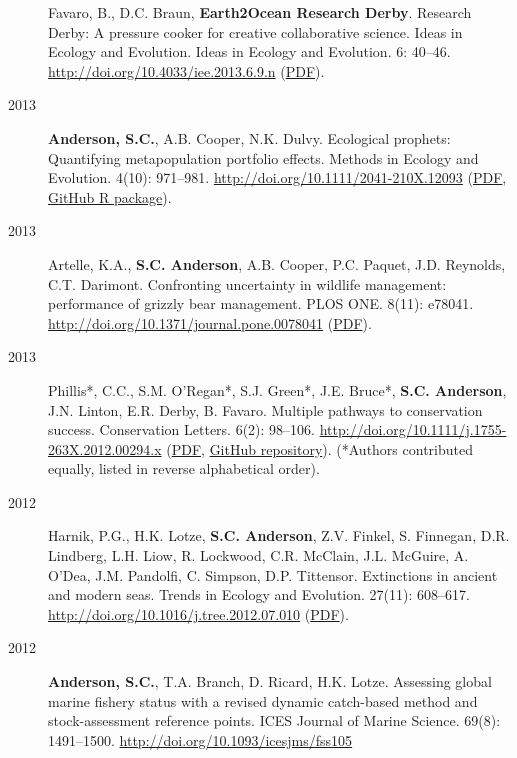 \begin{description}
Favaro, B., D.C. Braun, \textbf{Earth2Ocean Research Derby}. Research
Derby: A pressure cooker for creative collaborative science. Ideas in
Ecology and Evolution. Ideas in Ecology and Evolution. 6: 40--46.
\url{http://doi.org/10.4033/iee.2013.6.9.n}
(\href{http://library.queensu.ca/ojs/index.php/IEE/article/download/4931/4899}{PDF}).
\item[2013]
\textbf{Anderson, S.C.}, A.B. Cooper, N.K. Dulvy. Ecological prophets:
Quantifying metapopulation portfolio effects. Methods in Ecology and
Evolution. 4(10): 971--981. \url{http://doi.org/10.1111/2041-210X.12093}
(\href{https://dl.dropboxusercontent.com/u/254940/papers/Anderson_etal_2013_ecological_prophets_with_SOM.pdf}{PDF},
\href{https://github.com/seananderson/ecofolio}{GitHub R package}).
\item[2013]
Artelle, K.A., \textbf{S.C. Anderson}, A.B. Cooper, P.C. Paquet, J.D.
Reynolds, C.T. Darimont. Confronting uncertainty in wildlife management:
performance of grizzly bear management. PLOS ONE. 8(11): e78041.
\url{http://doi.org/10.1371/journal.pone.0078041}
(\href{http://www.plosone.org/article/fetchObject.action?uri=info\%3Adoi\%2F10.1371\%2Fjournal.pone.0078041\&representation=PDF}{PDF}).
\item[2013]
Phillis*, C.C., S.M. O'Regan*, S.J. Green*, J.E. Bruce*, \textbf{S.C.
Anderson}, J.N. Linton, E.R. Derby, B. Favaro. Multiple pathways to
conservation success. Conservation Letters. 6(2): 98--106.
\url{http://doi.org/10.1111/j.1755-263X.2012.00294.x}
(\href{https://dl.dropboxusercontent.com/u/254940/papers/Phillis_etal_2012_Multiple_pathways_to_conservation_success.pdf}{PDF},
\href{https://github.com/seananderson/conservation_pathways}{GitHub
repository}). (*Authors contributed equally, listed in reverse
alphabetical order).
\item[2012]
Harnik, P.G., H.K. Lotze, \textbf{S.C. Anderson}, Z.V. Finkel, S.
Finnegan, D.R. Lindberg, L.H. Liow, R. Lockwood, C.R. McClain, J.L.
McGuire, A. O'Dea, J.M. Pandolfi, C. Simpson, D.P. Tittensor.
Extinctions in ancient and modern seas. Trends in Ecology and Evolution.
27(11): 608--617. \url{http://doi.org/10.1016/j.tree.2012.07.010}
(\href{https://dl.dropboxusercontent.com/u/254940/papers/Harnik_etal_2012_Extinctions_in_ancient_and_modern_seas.pdf}{PDF}).
\item[2012]
\textbf{Anderson, S.C.}, T.A. Branch, D. Ricard, H.K. Lotze. Assessing
global marine fishery status with a revised dynamic catch-based method
and stock-assessment reference points. ICES Journal of Marine Science.
69(8): 1491--1500. \url{http://doi.org/10.1093/icesjms/fss105}

\end{description}
